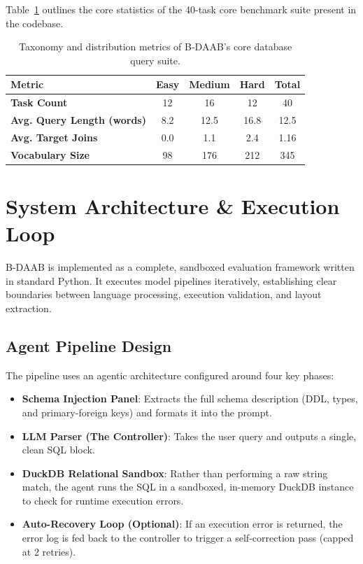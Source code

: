 \documentclass[11pt,a4paper]{article}
\begin{document}
Table~\ref{tab:dataset_stats} outlines the core statistics of the 40-task core benchmark suite present in the codebase.

\begin{table}[h]
\centering
\small
\begin{tabular}{lcccc}
\toprule
\textbf{Metric} & \textbf{Easy} & \textbf{Medium} & \textbf{Hard} & \textbf{Total} \\
\midrule
\textbf{Task Count} & 12 & 16 & 12 & 40 \\
\textbf{Avg. Query Length (words)} & 8.2 & 12.5 & 16.8 & 12.5 \\
\textbf{Avg. Target Joins} & 0.0 & 1.1 & 2.4 & 1.16 \\
\textbf{Vocabulary Size} & 98 & 176 & 212 & 345 \\
\bottomrule
\end{tabular}
\caption{Taxonomy and distribution metrics of B-DAAB's core database query suite.}
\label{tab:dataset_stats}
\end{table}

\section{System Architecture & Execution Loop}
B-DAAB is implemented as a complete, sandboxed evaluation framework written in standard Python. It executes model pipelines iteratively, establishing clear boundaries between language processing, execution validation, and layout extraction.

\subsection{Agent Pipeline Design}
The pipeline uses an agentic architecture configured around four key phases:
\begin{itemize}
    \item \textbf{Schema Injection Panel}: Extracts the full schema description (DDL, types, and primary-foreign keys) and formats it into the prompt.
    \item \textbf{LLM Parser (The Controller)}: Takes the user query and outputs a single, clean SQL block.
    \item \textbf{DuckDB Relational Sandbox}: Rather than performing a raw string match, the agent runs the SQL in a sandboxed, in-memory DuckDB instance to check for runtime execution errors.
    \item \textbf{Auto-Recovery Loop (Optional)}: If an execution error is returned, the error log is fed back to the controller to trigger a self-correction pass (capped at 2 retries).
\end{itemize}
\end{document}
